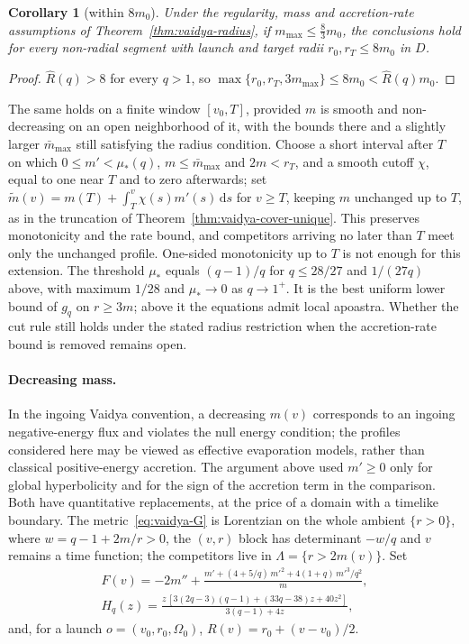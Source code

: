 \documentclass[aip,jmp,amsmath,amssymb,reprint]{revtex4-2}
\newcommand{\dd}{\mathrm{d}}
\theoremstyle{plain}
\newtheorem{corollary}[proposition]{Corollary}
\theoremstyle{definition}
\begin{document}
\begin{corollary}[within $8m_0$]\label{cor:vaidya-8m}
Under the regularity, mass and accretion-rate assumptions of Theorem~\ref{thm:vaidya-radius}, if $m_{\max}\le\frac83m_0$, the
conclusions hold for every non-radial segment with launch and target radii $r_0,r_T\le8m_0$ in $D$.
\end{corollary}

\begin{proof}
$\widehat R(q)>8$ for every $q>1$, so $\max\{r_0,r_T,3m_{\max}\}\le8m_0<\widehat R(q)m_0$.
\end{proof}

The same holds on a finite window $[v_0,T]$, provided $m$ is smooth and non-decreasing on an open
neighborhood of it, with the bounds there and a slightly larger $\bar m_{\max}$ still satisfying the radius
condition. Choose a short interval after $T$ on which $0\le m'<\mu_*(q)$, $m\le\bar m_{\max}$ and $2m<r_T$, and a smooth cutoff
$\chi$, equal to one near $T$ and to zero afterwards; set $\widetilde m(v)=m(T)+\int_T^v\chi(s)m'(s)\,\dd s$ for $v\ge T$,
keeping $m$ unchanged up to $T$, as in the truncation of Theorem~\ref{thm:vaidya-cover-unique}. This preserves
monotonicity and the rate bound, and competitors arriving no later than $T$ meet only the unchanged
profile. One-sided monotonicity up to $T$ is not enough for this extension. The threshold $\mu_*$ equals $(q-1)/q$ for $q\le28/27$ and $1/(27q)$ above,
with maximum $1/28$ and $\mu_*\to0$ as $q\to1^+$. It is the best uniform lower bound of $g_q$ on $r\ge3m$; above it the
equations admit local apoastra. Whether the cut rule still holds under the stated radius restriction when
the accretion-rate bound is removed remains open.

\paragraph{Decreasing mass.} In the ingoing Vaidya convention, a decreasing $m(v)$ corresponds to
an ingoing negative-energy flux and violates the null energy condition; the profiles considered
here may be viewed as effective evaporation models, rather than classical positive-energy
accretion. The argument above used $m'\ge0$ only for global hyperbolicity and for the sign of the
accretion term in the comparison. Both have quantitative replacements, at the price of a domain
with a timelike boundary. The metric~\eqref{eq:vaidya-G} is Lorentzian on the whole ambient
$\{r>0\}$, where $w=q-1+2m/r>0$, the $(v,r)$ block has determinant $-w/q$ and $v$ remains a time
function; the competitors live in $\Lambda=\{r>2m(v)\}$. Set
\begin{gather*}
  F(v)=-2m''+\frac{m'+(4+5/q)\,m'^2+4(1+q)\,m'^3/q^2}{m},\\
  H_q(z)=\frac{z\,[3(2q-3)(q-1)+(33q-38)z+40z^2]}{3(q-1)+4z},
\end{gather*}
and, for a launch $o=(v_0,r_0,\Omega_0)$, $R(v)=r_0+(v-v_0)/2$.
\end{document}
